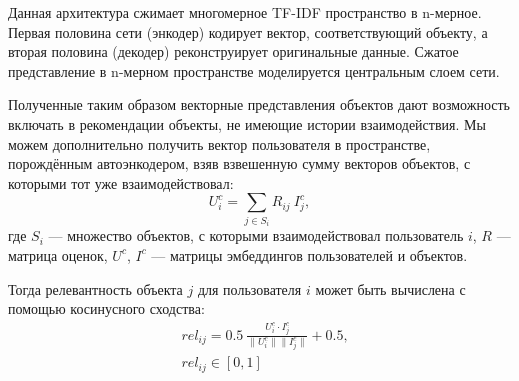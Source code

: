 \begin{figure}[h!]
\caption{}
\label{fig:autoencoder_simple}
\end{figure}

Данная архитектура сжимает многомерное TF-IDF пространство в n-мерное.
Первая половина сети (энкодер) кодирует вектор, соответствующий объекту, а вторая половина (декодер) реконструирует оригинальные данные.
Сжатое представление в n-мерном пространстве моделируется центральным слоем сети.

Полученные таким образом векторные представления объектов дают возможность включать в рекомендации объекты, не имеющие истории взаимодействия.
Мы можем дополнительно получить вектор пользователя в пространстве, порождённым автоэнкодером, взяв взвешенную сумму векторов объектов, с которыми тот уже взаимодействовал:
\begin{equation}\label{eq:content-user-emb}
        U_{i}^{c} = \sum_{j \in S_i}{R_{ij}~I_{j}^{c}},
\end{equation}
где $S_i$ --- множество объектов, с которыми взаимодействовал пользователь $i$,
$R$ --- матрица оценок,
$U^c$, $I^c$ --- матрицы эмбеддингов пользователей и объектов.

Тогда релевантность объекта $j$ для пользователя $i$ может быть вычислена с помощью косинусного сходства:
\begin{equation}\label{eq:content-user-rel}
    \begin{aligned}
        & rel_{ij} = 0.5~\frac{U_{i}^{c} \cdot I_{j}^{c}}{\| U_{i}^{c} \| \| I_{j}^{c} \|} + 0.5, \\
        & rel_{ij} \in [0, 1]
    \end{aligned}
\end{equation}

